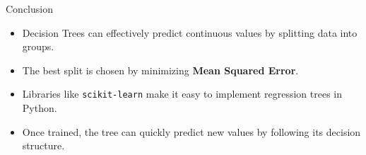 \documentclass[11pt]{beamer}
\begin{document}
%
%
\begin{frame}{Conclusion}
    \begin{itemize}
        \item Decision Trees can effectively predict continuous values by splitting data into groups.
        \item The best split is chosen by minimizing \textbf{Mean Squared Error}.
        \item Libraries like \texttt{scikit-learn} make it easy to implement regression trees in Python.
        \item Once trained, the tree can quickly predict new values by following its decision structure.
    \end{itemize}
\end{frame}
\end{document}
